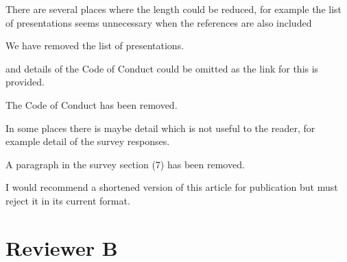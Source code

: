 \documentclass[11pt]{article}
\begin{document}
\begin{quoting}
There are several places where the length could be reduced, for example the list of presentations seems unnecessary when the references are also included 

\end{quoting}

We have removed the list of presentations.

\begin{quoting}

and details of the Code of Conduct could be omitted as the link for this is provided. 

\end{quoting}

The Code of Conduct has been removed.

\begin{quoting}

 In some places there is maybe detail which is not useful to the reader, for example detail of the survey responses.
 
\end{quoting}

A paragraph in the survey section (7) has been removed.

\begin{quoting}
I would recommend a shortened version of this article for publication but must reject it in its current format.
\end{quoting}


\section*{Reviewer B}
\end{document}
